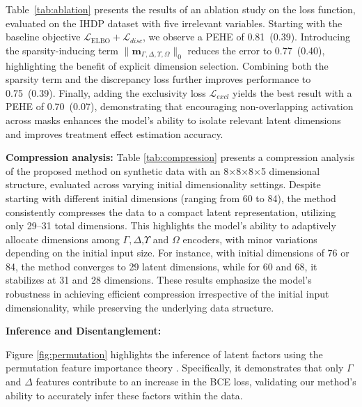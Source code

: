 \documentclass[doubleblind]{ecai}
\begin{document}
	Table~\ref{tab:ablation} presents the results of an ablation study on the loss function, evaluated on the IHDP dataset with five irrelevant variables. Starting with the baseline objective $\mathcal{L}_{\text{ELBO}} + \mathcal{L}_{disc}$, we observe a PEHE of 0.81~(0.39). Introducing the sparsity-inducing term $\|\mathbf{m}_{\Gamma, \Delta, \Upsilon, \Omega}\|_0$ reduces the error to 0.77~(0.40), highlighting the benefit of explicit dimension selection. Combining both the sparsity term and the discrepancy loss further improves performance to 0.75~(0.39). Finally, adding the exclusivity loss $\mathcal{L}_{\mathit{excl}}$ yields the best result with a PEHE of {0.70~(0.07)}, demonstrating that encouraging non-overlapping activation across masks enhances the model’s ability to isolate relevant latent dimensions and improves treatment effect estimation accuracy.
	
	
	\textbf{Compression analysis:} Table \ref{tab:compression} presents a compression analysis of the proposed method on synthetic data with an 8×8×8×5 dimensional structure, evaluated across varying initial dimensionality settings. Despite starting with different initial dimensions (ranging from 60 to 84), the method consistently compresses the data to a compact latent representation, utilizing only 29–31 total dimensions. This highlights the model's ability to adaptively allocate dimensions among $\Gamma,\Delta$,$\Upsilon$ and $\Omega$ encoders, with minor variations depending on the initial input size. For instance, with initial dimensions of 76 or 84, the method converges to 29 latent dimensions, while for 60 and 68, it stabilizes at 31 and 28 dimensions. These results emphasize the model's robustness in achieving efficient compression irrespective of the initial input dimensionality, while preserving the underlying data structure.
	
	
	
	\textbf{Inference and Disentanglement:}
	
	Figure \ref{fig:permutation} highlights the inference of latent factors using the permutation feature importance theory \citep{Fisher,Khan2024OnTE}. Specifically, it demonstrates that only $\Gamma$ and $\Delta$ features contribute to an increase in the BCE loss, validating our method's ability to accurately infer these factors within the data.
	
\end{document}
